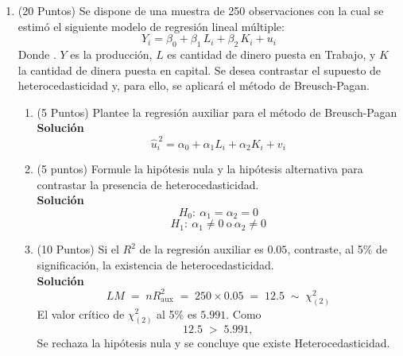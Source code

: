 \documentclass[10pt,a4paper]{article}
\begin{document}
\begin{enumerate}
\begin{enumerate}
\[
\begin{aligned}
\text{SST}&=740{,}000,\\[3pt]
\text{SSR}&=\sum e_i^2
=0^2+80^2+(-40)^2+(-160)^2+120^2=48{,}000,\\[3pt]
\text{SSE}&=\text{SST}-\text{SSR}=740{,}000-48{,}000=692{,}000.
\end{aligned}
\]
Por lo que la bondad de ajuste es:
\[
R^2=\frac{\text{SSR}}{\text{SST}}=\frac{692{,}000}{740{,}000}=0.9351
\]
    
    
\end{enumerate}

\item (20 Puntos) Se dispone de una muestra de 250 observaciones con la cual se estimó el siguiente modelo de regresión lineal múltiple:
$$Y_i = \beta_0 + \beta_1\,\textit{L}_i + \beta_2\,\textit{K}_i + u_i$$
Donde . $Y$ es la producción, $L$ es cantidad de dinero puesta en Trabajo, y $K$ la cantidad de dinera puesta en capital.
Se desea contrastar el supuesto de heterocedasticidad y, para ello, se aplicará el método de Breusch-Pagan.
\begin{enumerate}
    \item (5 Puntos) Plantee la regresión auxiliar para el método de Breusch-Pagan\\
    \textbf{Solución}\\
    $$\hat{u}_i^{\,2} = \alpha_0 + \alpha_1 {L}_i + \alpha_2 {K}_i + v_i$$
    
    \item (5 puntos) Formule la hipótesis nula y la hipótesis alternativa para contrastar la presencia de heterocedasticidad.\\
    \textbf{Solución}\\
    $$H_0:\ \alpha_1 = \alpha_2 =0$$
    $$H_1:\ \alpha_1 \neq 0 \ \text{o}\ \alpha_2 \neq 0 $$
    
    \item (10 Puntos) Si el $R^2$ de la regresión auxiliar es $0.05$, contraste, al 5\% de significación, la existencia de heterocedasticidad.\\
    \textbf{Solución}\\
    $$LM \;=\; n R^2_{\text{aux}} \;=\; 250 \times 0.05\;=\; 12.5 \;\sim\; \chi^2_{(2)}$$
    El valor crítico de $\chi^2_{(2)}$ al 5\% es $5.991$. Como
    $$12.5 \;>\; 5.991,$$
    Se rechaza la hipótesis nula y se concluye que existe Heterocedasticidad.
\end{enumerate}


\end{enumerate}
\end{document}
